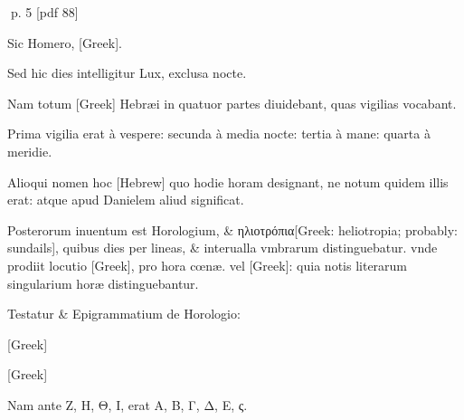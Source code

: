 \clearpage
p. 5 [pdf 88]

\begin{parnumbers}

Sic Homero, \textgreek{[Greek]}.

Sed hic dies intelligitur Lux, exclusa nocte.

Nam totum \textgreek{[Greek]} Hebræi in quatuor partes diuidebant, quas vigilias vocabant.

Prima vigilia erat à vespere: secunda à media nocte: tertia à mane: quarta à meridie.

Alioqui nomen hoc \texthebrew{[Hebrew]} quo hodie horam designant, ne notum quidem illis erat: atque apud Danielem aliud significat.

Posterorum inuentum est Horologium, \& \textgreek{ηλιοτρόπια[Greek: heliotropia; probably: sundails]}, quibus dies per lineas, \& interualla vmbrarum distinguebatur. vnde prodiit locutio \textgreek{[Greek]}, pro hora cœnæ. vel \textgreek{[Greek]}:  quia notis literarum singularium horæ distinguebantur.

Testatur \& Epigrammatium de Horologio:

\textgreek{[Greek]}

\textgreek{[Greek]}

Nam ante \textgreek{Ζ, Η, Θ, Ι,} erat \textgreek{Α, Β, Γ, Δ, Ε, ς.}


\end{parnumbers}
